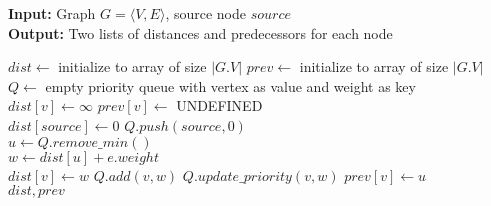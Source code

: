 \documentclass[12pt,a4paper]{article}
\begin{document}
	\begin{algorithm}
		\textbf{Input:} Graph $ G = \langle V, E \rangle $, source node $ source $
		\\\textbf{Output:} Two lists of distances and predecessors for each node
		\\
		\begin{algorithmic}
				\State $ dist \gets $ initialize to array of size $ |G.V| $
				\State $ prev \gets $ initialize to array of size $ |G.V| $
				\State $ Q \gets $ empty priority queue with vertex as value and weight as key
				\\
						\State $ dist[v] \gets \infty $
					\EndIf
					\State $ prev[v] \gets $ UNDEFINED
				\EndFor
				\\
				\State $ dist[source] \gets 0 $
				\State $ Q.push(source, 0) $
				\\
					\State $ u \gets Q.remove\_min() $
					\\
						\State $ w \gets dist[u] + e.weight $
						\\
							\State $ dist[v] \gets w $
								\State $ Q.add(v, w) $
							\Else
								\State $ Q.update\_priority(v, w) $
							\EndIf
							\State $ prev[v] \gets u $
						\EndIf
					\EndFor
				\EndWhile
				\\
				\Return $ dist, prev $
			\EndProcedure
		\end{algorithmic}
	\end{algorithm}
\end{document}
